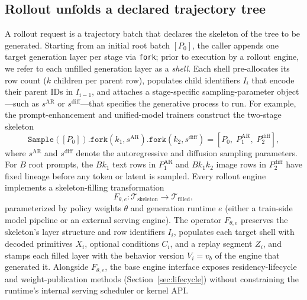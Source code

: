 \documentclass[10pt]{article}
\newcommand{\sample}{\texttt{Sample}}
\begin{document}
\subsection{Rollout unfolds a declared trajectory tree}
\label{sec:unfold}

A rollout request is a trajectory batch that declares the skeleton of the tree to be generated.
Starting from an initial root batch $[P_0]$, the caller appends one target generation layer per stage via \texttt{fork}; prior to execution by a rollout engine, we refer to each unfilled generation layer as a \emph{shell}.
Each shell pre-allocates its row count ($k$ children per parent row), populates child identifiers $I_i$ that encode their parent IDs in $I_{i-1}$, and attaches a stage-specific sampling-parameter object---such as $s^{\mathrm{AR}}$ or $s^{\mathrm{diff}}$---that specifies the generative process to run.
For example, the prompt-enhancement and unified-model trainers construct the two-stage skeleton
\begin{equation}
\sample([P_0]).\texttt{fork}(k_1,s^{\mathrm{AR}}).\texttt{fork}(k_2,s^{\mathrm{diff}})
= [P_0,\;P_1^{\mathrm{AR}},\;P_2^{\mathrm{diff}}],
\label{eq:skeleton}
\end{equation}
where $s^{\mathrm{AR}}$ and $s^{\mathrm{diff}}$ denote the autoregressive and diffusion sampling parameters.
For $B$ root prompts, the $B k_1$ text rows in $P_1^{\mathrm{AR}}$ and $B k_1 k_2$ image rows in $P_2^{\mathrm{diff}}$ have fixed lineage before any token or latent is sampled.
Every rollout engine implements a skeleton-filling transformation
\begin{equation}
F_{\theta,e}: \mathcal{T}_{\mathrm{skeleton}} \longrightarrow \mathcal{T}_{\mathrm{filled}},
\label{eq:engine}
\end{equation}
parameterized by policy weights $\theta$ and generation runtime $e$ (either a train-side model pipeline or an external serving engine).
The operator $F_{\theta,e}$ preserves the skeleton's layer structure and row identifiers $I_i$, populates each target shell with decoded primitives $X_i$, optional conditions $C_i$, and a replay segment $Z_i$, and stamps each filled layer with the behavior version $V_i = v_b$ of the engine that generated it.
Alongside $F_{\theta,e}$, the base engine interface exposes residency-lifecycle and weight-publication methods (Section~\ref{sec:lifecycle}) without constraining the runtime's internal serving scheduler or kernel API.
\end{document}
